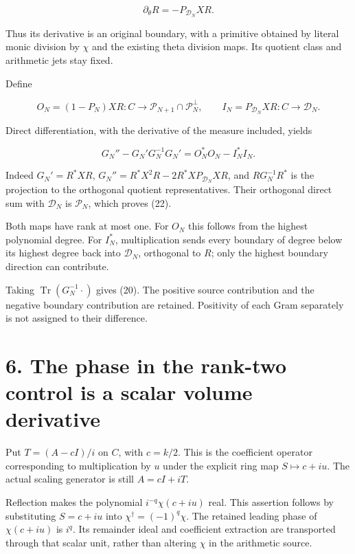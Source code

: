 \documentclass[
  11pt,
]{article}
\begin{document}
\[
\partial_\theta R=-P_{\mathcal D_N}XR.
\tag{21}
\]

Thus its derivative is an original boundary, with a primitive obtained
by literal monic division by \(\chi\) and the existing theta division
maps. Its quotient class and arithmetic jets stay fixed.

Define

\[
O_N=(1-P_N)XR:C\to\mathcal P_{N+1}\cap\mathcal P_N^\perp,
\qquad
I_N=P_{\mathcal D_N}XR:C\to\mathcal D_N.
\]

Direct differentiation, with the derivative of the measure included,
yields

\[
\boxed{G_N''-G_N'G_N^{-1}G_N'=O_N^*O_N-I_N^*I_N.}
\tag{22}
\]

Indeed \(G_N'=R^*XR\), \(G_N''=R^*X^2R-2R^*XP_{\mathcal D_N}XR\), and
\(RG_N^{-1}R^*\) is the projection to the orthogonal quotient
representatives. Their orthogonal direct sum with \(\mathcal D_N\) is
\(\mathcal P_N\), which proves (22).

Both maps have rank at most one. For \(O_N\) this follows from the
highest polynomial degree. For \(I_N^*\), multiplication sends every
boundary of degree below its highest degree back into \(\mathcal D_N\),
orthogonal to \(R\); only the highest boundary direction can contribute.

Taking \(\operatorname{Tr}(G_N^{-1}\cdot)\) gives (20). The positive
source contribution and the negative boundary contribution are retained.
Positivity of each Gram separately is not assigned to their difference.

\section{6. The phase in the rank-two control is a scalar volume
derivative}\label{the-phase-in-the-rank-two-control-is-a-scalar-volume-derivative}

Put \(T=(A-cI)/i\) on \(C\), with \(c=k/2\). This is the coefficient
operator corresponding to multiplication by \(u\) under the explicit
ring map \(S\mapsto c+iu\). The actual scaling generator is still
\(A=cI+iT\).

Reflection makes the polynomial \(i^{-q}\chi(c+iu)\) real. This
assertion follows by substituting \(S=c+iu\) into
\(\chi^\dagger=(-1)^q\chi\). The retained leading phase of
\(\chi(c+iu)\) is \(i^q\). Its remainder ideal and coefficient
extraction are transported through that scalar unit, rather than
altering \(\chi\) in the arithmetic source.
\end{document}
